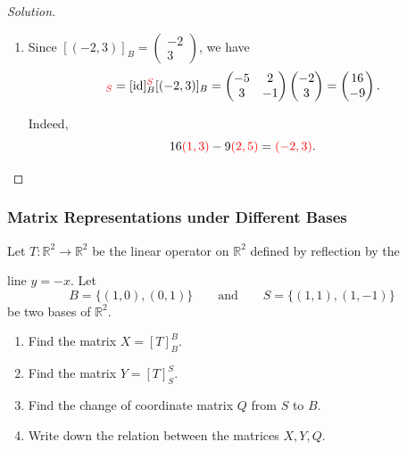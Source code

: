 \documentclass[12pt]{article}
\newenvironment{solution}
{\begin{proof}[Solution]}
{\end{proof}}
\begin{document}
\begin{solution}
\begin{enumerate}
    \item[(c)] Since $[(-2,3)]_B
    =
    \begin{pmatrix}
        -2\\
        3
    \end{pmatrix}$,
    we have
    \begin{align*}
        [(-2,3)]_{\textcolor{red}{S}}
        =
        [\operatorname{id}]_B^{\textcolor{red}{S}}[(-2,3)]_B
        =
        \begin{pmatrix}
            -5 & 2\\
            3 & -1
        \end{pmatrix}
        \begin{pmatrix}
            -2\\
            3
        \end{pmatrix}
        =
        \begin{pmatrix}
            16\\
            -9
        \end{pmatrix}.
    \end{align*}

    Indeed,
    \[
    16\textcolor{red}{(1,3)}-9\textcolor{red}{(2,5)}=\textcolor{red}{(-2,3)}.
    \]
\end{enumerate}
\end{solution}

\subsubsection{Matrix Representations under Different Bases}
Let $T:\mathbb{R}^2\to\mathbb{R}^2$ be the linear operator on $\mathbb{R}^2$ defined by reflection by the 

line $y=-x$. Let
\[
B=\{(1,0),(0,1)\}
\qquad\text{and}\qquad
S=\{(1,1),(1,-1)\}
\]
be two bases of $\mathbb{R}^2$.

\begin{enumerate}
    \item[(a)] Find the matrix $X=[T]_B^B$.

    \item[(b)] Find the matrix $Y=[T]_S^S$.

    \item[(c)] Find the change of coordinate matrix $Q$ from $S$ to $B$.

    \item[(d)] Write down the relation between the matrices $X,Y,Q$.
\end{enumerate}
\end{document}
